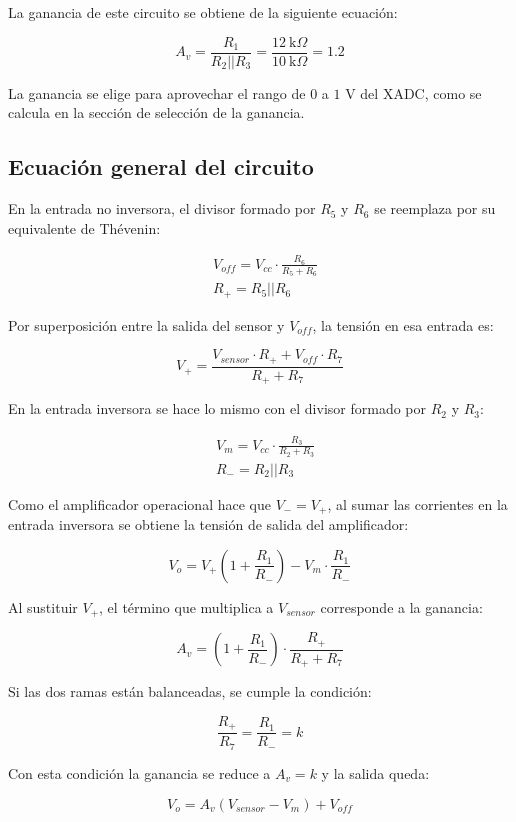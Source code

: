 \documentclass[spanish,10pt,a4paper,titlepage]{article}
\begin{document}
	 La ganancia de este circuito se obtiene de la siguiente ecuación:
	 
	 \[A_v = \frac{R_1}{R_2 || R_3} = \frac{12\ \text{k}\Omega}{10\ \text{k}\Omega} = 1.2\]
	 
	 La ganancia se elige para aprovechar el rango de $0$ a $1$ V del XADC, como se calcula en la sección de selección de la ganancia.

	\subsection{Ecuación general del circuito}
	En la entrada no inversora, el divisor formado por $R_5$ y $R_6$ se reemplaza por su equivalente de Thévenin:

	\begin{align*}
		&V_{off} = V_{cc} \cdot \frac{R_6}{R_5 + R_6}\\
		&R_+ = R_5 || R_6
	\end{align*}

	Por superposición entre la salida del sensor y $V_{off}$, la tensión en esa entrada es:

	\[V_+ = \frac{V_{sensor} \cdot R_+ + V_{off} \cdot R_7}{R_+ + R_7}\]

	En la entrada inversora se hace lo mismo con el divisor formado por $R_2$ y $R_3$:

	\begin{align*}
		&V_m = V_{cc} \cdot \frac{R_3}{R_2 + R_3}\\
		&R_- = R_2 || R_3
	\end{align*}

	Como el amplificador operacional hace que $V_- = V_+$, al sumar las corrientes en la entrada inversora se obtiene la tensión de salida del amplificador:

	\[V_o = V_+ \left(1 + \frac{R_1}{R_-}\right) - V_m \cdot \frac{R_1}{R_-}\]

	Al sustituir $V_+$, el término que multiplica a $V_{sensor}$ corresponde a la ganancia:

	\[A_v = \left(1 + \frac{R_1}{R_-}\right) \cdot \frac{R_+}{R_+ + R_7}\]

	Si las dos ramas están balanceadas, se cumple la condición:

	\[\frac{R_+}{R_7} = \frac{R_1}{R_-} = k\]

	Con esta condición la ganancia se reduce a $A_v = k$ y la salida queda:

	\[V_o = A_v \left(V_{sensor} - V_m\right) + V_{off}\]
\end{document}
